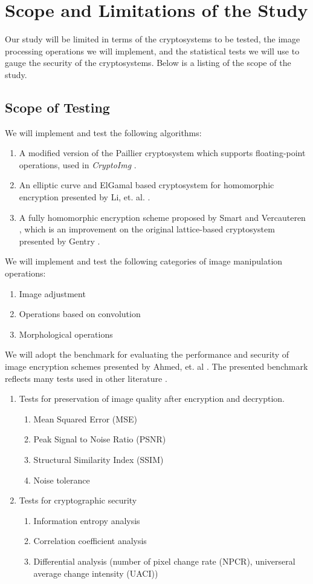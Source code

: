 \section{Scope and Limitations of the Study}
Our study will be limited in terms of the cryptosystems to be tested, the image processing operations we will implement, and the statistical tests we will use to gauge the security of the cryptosystems. Below is a listing of the scope of the study.

\subsection{Scope of Testing}
We will implement and test the following algorithms:
\begin{enumerate}
	\item A modified version of the Paillier cryptosystem \cite{stern_public-key_1999} which supports floating-point operations, used in \textit{CryptoImg} \cite{ziad_cryptoimg:_2016}.
	\item An elliptic curve and ElGamal based cryptosystem for homomorphic encryption presented by Li, et. al. \cite{li_elliptic_2012}.
	\item A fully homomorphic encryption scheme proposed by Smart and Vercauteren \cite{hutchison_fully_2010}, which is an improvement on the original lattice-based cryptosystem presented by Gentry \cite{gentry_fully_2009}.
\end{enumerate}
We will implement and test the following categories of image manipulation operations:
\begin{enumerate}
	\item Image adjustment
	\item Operations based on convolution
	\item Morphological operations
\end{enumerate}
We will adopt the benchmark for evaluating the performance and security of image encryption schemes presented by Ahmed, et. al \cite{ahmed_benchmark_2016}. The presented benchmark reflects many tests used in other literature \cite{ahmad_efficiency_2012, wu_npcr_2011}.
\begin{enumerate}
	\item Tests for preservation of image quality after encryption and decryption.
	\begin{enumerate}
		\item Mean Squared Error (MSE)
		\item Peak Signal to Noise Ratio (PSNR)
		\item Structural Similarity Index (SSIM)
		\item Noise tolerance
	\end{enumerate}
	\item Tests for cryptographic security
	\begin{enumerate}
		\item Information entropy analysis
		\item Correlation coefficient analysis
		\item Differential analysis (number of pixel change rate (NPCR), universeral average change intensity (UACI))
	\end{enumerate}
\end{enumerate}
